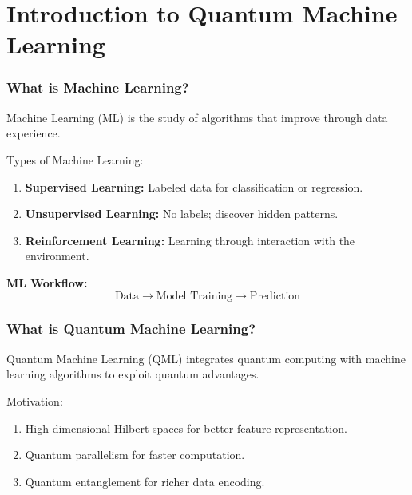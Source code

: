 \documentclass{beamer}
\begin{document}
\section{Introduction to Quantum Machine Learning}

\begin{frame}
\frametitle{What is Machine Learning?}

Machine Learning (ML) is the study of algorithms that improve through data experience.

\begin{block}{Types of Machine Learning: }
\begin{enumerate}
\item \textbf{Supervised Learning:} Labeled data for classification or regression.

\item \textbf{Unsupervised Learning:} No labels; discover hidden patterns.

\item \textbf{Reinforcement Learning:} Learning through interaction with the environment.
\end{enumerate}

\noindent
\end{block}

\begin{block}{}
\textbf{ML Workflow:}
\[
\text{Data} \rightarrow \text{Model Training} \rightarrow \text{Prediction}
\]
\end{block}
\end{frame}

\begin{frame}
\frametitle{What is Quantum Machine Learning?}

Quantum Machine Learning (QML) integrates quantum computing with machine learning algorithms to exploit quantum advantages.

\begin{block}{Motivation: }
\begin{enumerate}
\item High-dimensional Hilbert spaces for better feature representation.

\item Quantum parallelism for faster computation.

\item Quantum entanglement for richer data encoding.
\end{enumerate}

\noindent
\end{block}
\end{frame}
\end{document}
